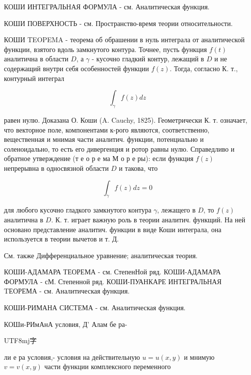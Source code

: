 \documentclass[10pt]{article}
\begin{document}
КОШИ ИНТЕГРАЛЬНАЯ ФОРМУЛА - см. Аналитическая функция.



КОШИ ПОВЕРХНОСТЬ - см. Пространство-время теории относительности.



КОШИ TEOPEMA - теорема об обрашении в нуль интеграла от аналитической функции, взятого вдоль замкнутого контура. Точнее, пусть функция $f(t)$ аналитична в области $D$, а $\gamma$ - кусочно гладкий контур, лежащий в $D$ и не содержащий внутри себя особенностей функции $f(z)$. Тогда, согласно К. т., контурный интеграл



\[

\int_{\gamma} f(z) d z

\]



равен нулю. Доказана О. Коши (A. Cauchy, 1825). Геометрически К. т. означает, что векторное поле, компонентами к-рого являются, соответственно, вещественная и мнимая части аналитич. функции, потенциально и соленоидально, то есть его дивергенция и ротор равны нулю. Справедливо и обратное утверждение (т е о р е ма М о р е ры): если функция $f(z)$ непрерывна в односвязной области $D$ и такова, что



\[

\int_{\gamma} f(z) d z=0

\]



для любого кусочно гладкого замкнутого контура $\gamma$, лежащего в $D$, то $f(z)$ аналитична в $D$. К. т. играет важную роль в теории аналитич. функщий. На ней основано представление аналитич. функции в виде Коши интеграла, она используется в теории вычетов и т. Д.



См. также Дифференциальное уравнение; аналитическая теория.



КОШИ-АДАМАРА ТЕОРЕМА - см. СтепенНой ряд. КОШИ-АДАМАРА ФОРМУЛА - сМ. Степенной ряд. КОШИ-ПУАНКАРЕ ИНТЕГРАЛЬНАЯ TЕОРЕМА - см. Аналитическая функция.



КОШИ-РИМАНА СИСТЕМА - см. Аналитическая функция.



КОШи-РИмАнА условия, Д' Алам бе ра-\begin{CJK}{UTF8}{mj}字\end{CJK} ли е ра условия,- условия на действительную $u=u(x, y)$ и мнимую $v=v(x, y)$ части функции комплексного переменного
\end{document}
